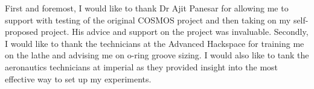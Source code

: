 First and foremost, I would like to thank Dr Ajit Panesar for allowing me to support with testing of the original COSMOS project and then taking on my self-proposed project. His advice and support on the project was invaluable. Secondly, I would like to thank the technicians at the Advanced Hackspace for training me on the lathe and advising me on o-ring groove sizing. I would also like to tank the aeronautics technicians at imperial as they provided insight into the most effective way to set up my experiments. 